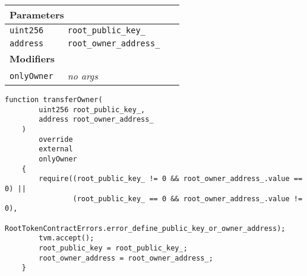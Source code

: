 \ifsoltables
\noindent\begin{tabular}{|l|l|p{5cm}|}\hline
\multicolumn{3}{|l|}{\bf Parameters}\\\hline
\tt uint256 & \tt root\_{}public\_{}key\_{} &\\\hline
\tt address & \tt root\_{}owner\_{}address\_{} &\\\hline
\multicolumn{3}{|l|}{\bf Modifiers}\\\hline
\tt onlyOwner & {\em no args} &\\\hline
\end{tabular}
\fi

\vspace{2cm}

\begin{lstlisting}[firstnumber=440]
    function transferOwner(
        uint256 root_public_key_,
        address root_owner_address_
    )
        override
        external
        onlyOwner
    {
        require((root_public_key_ != 0 && root_owner_address_.value == 0) ||
                (root_public_key_ == 0 && root_owner_address_.value != 0),
                RootTokenContractErrors.error_define_public_key_or_owner_address);
        tvm.accept();
        root_public_key = root_public_key_;
        root_owner_address = root_owner_address_;
    }
\end{lstlisting}
